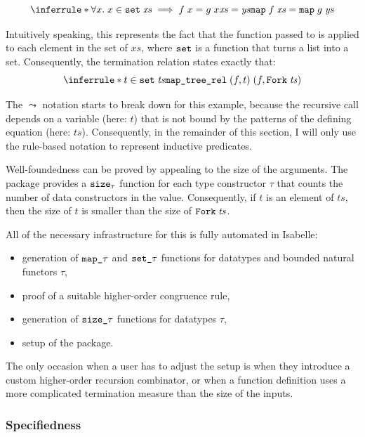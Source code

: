 \[
  \inferrule*{
    \forall x.\; x \in \holconst{set}\;\mathit{xs} \implies f\;x = g\;x\\
    \mathit{xs} = \mathit{ys}
  }{\holconst{map}\;f\;\mathit{xs} = \holconst{map}\;g\;\mathit{ys}}
\]

\noindent
Intuitively speaking, this represents the fact that the function passed to  is applied to each element in the set of $\mathit{xs}$, where $\texttt{\textup{set}}$ is a function that turns a list into a set.
Consequently, the termination relation states exactly that:
%
\[
  \inferrule*{t \in \holconst{set}\;\mathit{ts}}{\holconst{map\_tree\_rel}\;(f, t)\;(f, \holconst{Fork}\;\mathit{ts})}
\]

\noindent
The $\leadsto$ notation starts to break down for this example, because the recursive call depends on a variable (here: $t$) that is not bound by the patterns of the defining equation (here: $\mathit{ts}$).
Consequently, in the remainder of this section, I will only use the rule-based notation to represent inductive predicates.

Well-foundedness can be proved by appealing to the size of the arguments.
The  package provides a $\texttt{\textup{size}}_\tau$ function for each type constructor $\tau$ that counts the number of data constructors in the value.
Consequently, if $t$ is an element of $\mathit{ts}$, then the size of $t$ is smaller than the size of $\texttt{\textup{Fork}}\;\mathit{ts}$.

All of the necessary infrastructure for this is fully automated in Isabelle:
\begin{itemize}
  \item generation of $\texttt{\textup{map\_}}\tau$ and $\texttt{\textup{set\_}}\tau$ functions for datatypes and bounded natural functors $\tau$,
  \item proof of a suitable higher-order congruence rule,
  \item generation of $\texttt{\textup{size\_}}\tau$ functions for datatypes $\tau$,
  \item setup of the  package.
\end{itemize}

\noindent
The only occasion when a user has to adjust the setup is when they introduce a custom higher-order recursion combinator, or when a function definition uses a more complicated termination measure than the size of the inputs.

\subsubsection{Specifiedness}
\label{sec:preproc:dict:partial:spec}

